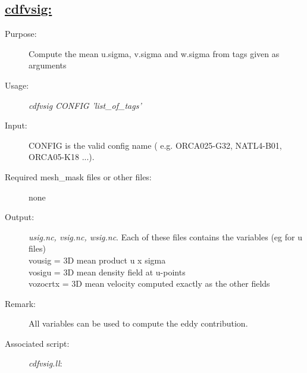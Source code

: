 \documentclass[a4paper,11pt]{article}
\begin{document}
\subsection*{\underline{cdfvsig:}}
\begin{description}
\item[Purpose:] Compute the mean u$.$sigma, v$.$sigma and w$.$sigma from tags given as arguments
\item[Usage:] {\em cdfvsig CONFIG 'list\_of\_tags' }
\item[Input:] CONFIG is the valid config name ( e.g. ORCA025-G32, NATL4-B01, ORCA05-K18 ...).
\item[Required mesh\_mask files or other files:]  none
\item[Output:] {\em usig.nc, vsig.nc, wsig.nc}. Each of these files contains the variables (eg for u files) \\
         vousig = 3D mean product u x sigma \\
         vosigu = 3D mean density field at u-points \\
         vozocrtx = 3D mean velocity computed exactly as the other fields
\item[Remark:]  All variables can be used to compute the eddy contribution.
\item[Associated script:] {\em cdfvsig.ll}:
\end{description}


\newpage
\end{document}
